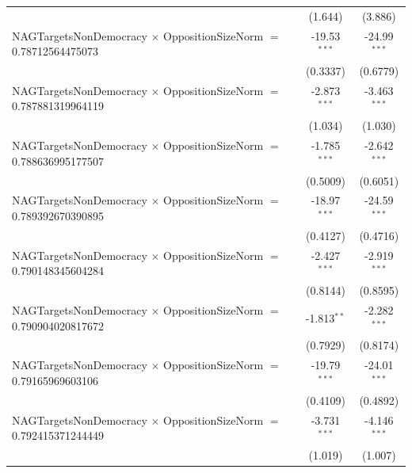 \begin{tabular}{lcc}
                                                                                & (1.644)              & (3.886)\\   
   NAGTargetsNonDemocracy $\times$ OppositionSizeNorm $=$ 0.78712564475073      & -19.53$^{***}$       & -24.99$^{***}$\\   
                                                                                & (0.3337)             & (0.6779)\\   
   NAGTargetsNonDemocracy $\times$ OppositionSizeNorm $=$ 0.787881319964119     & -2.873$^{***}$       & -3.463$^{***}$\\   
                                                                                & (1.034)              & (1.030)\\   
   NAGTargetsNonDemocracy $\times$ OppositionSizeNorm $=$ 0.788636995177507     & -1.785$^{***}$       & -2.642$^{***}$\\   
                                                                                & (0.5009)             & (0.6051)\\   
   NAGTargetsNonDemocracy $\times$ OppositionSizeNorm $=$ 0.789392670390895     & -18.97$^{***}$       & -24.59$^{***}$\\   
                                                                                & (0.4127)             & (0.4716)\\   
   NAGTargetsNonDemocracy $\times$ OppositionSizeNorm $=$ 0.790148345604284     & -2.427$^{***}$       & -2.919$^{***}$\\   
                                                                                & (0.8144)             & (0.8595)\\   
   NAGTargetsNonDemocracy $\times$ OppositionSizeNorm $=$ 0.790904020817672     & -1.813$^{**}$        & -2.282$^{***}$\\   
                                                                                & (0.7929)             & (0.8174)\\   
   NAGTargetsNonDemocracy $\times$ OppositionSizeNorm $=$ 0.79165969603106      & -19.79$^{***}$       & -24.01$^{***}$\\   
                                                                                & (0.4109)             & (0.4892)\\   
   NAGTargetsNonDemocracy $\times$ OppositionSizeNorm $=$ 0.792415371244449     & -3.731$^{***}$       & -4.146$^{***}$\\   
                                                                                & (1.019)              & (1.007)\\   

\end{tabular}
